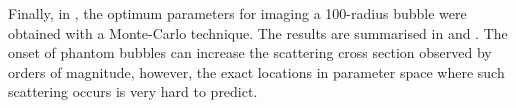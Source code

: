 Finally, in ,  the optimum parameters for imaging a \unit{100}\nano\metre-radius bubble 
were obtained with a Monte-Carlo technique. The results are summarised in  and .
The onset of phantom bubbles can increase the scattering cross section observed by orders of magnitude,
however, the exact locations in parameter space where such scattering occurs is very hard to predict.








